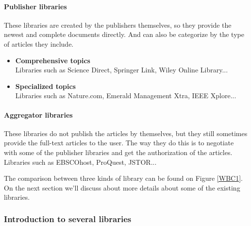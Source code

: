 \paragraph{Publisher libraries}

	These libraries are created by the publishers themselves, so they provide the newest and complete documents directly.
	And can also be categorize by the type of articles they include.
	
	\begin{itemize}
		
		\item\textbf{Comprehensive topics}\\Libraries such as Science Direct, Springer Link, Wiley Online Library...
		\item\textbf{Specialized topics}\\Libraries such as Nature.com, Emerald Management Xtra, IEEE Xplore...
		
	\end{itemize}
	
\paragraph{Aggregator libraries}

	These libraries do not publish the articles by themselves, but they still sometimes provide the full-text articles to the user.
	The way they do this is to negotiate with some of the publisher libraries and get the authorization of the articles.
	Libraries such as EBSCOhost, ProQuest, JSTOR...

The comparison between three kinds of library can be found on Figure \ref{WBC1}. 
On the next section we'll discuss about more details about 
some of the existing libraries.

\subsubsection{Introduction to several libraries }

